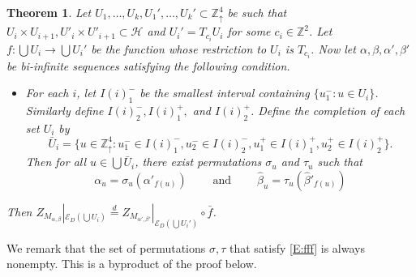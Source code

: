 \documentclass[aop, preprint]{imsart}
\theoremstyle{plain}
\newtheorem{theorem}{Theorem}[section]
\theoremstyle{definition}
\theoremstyle{plain}
\newcommand{\sset}{\subset}
\newcommand{\al}{\alpha}
\newcommand{\mathand}{\;\text{and}\;}
\newcommand{\mathfor}{\;\text{for}\;}
\newcommand{\be}{\beta}
\newcommand{\sig}{\sigma}
\newcommand{\scrE}{\mathcal{E}}
\newcommand{\Zd}{\mathds{Z}^4_\uparrow}
\newcommand{\scrH}{\mathcal{H}}
\newcommand{\Z}{\mathds{Z}}
\newcommand{\eqd}{\stackrel{d}{=}}
\newcommand{\X}{\times}
\begin{document}
\begin{theorem}
	\label{T:towers}
	Let $U_1, \dots, U_k, U_1', \dots, U_k' \sset \Zd$ be such that $U_i \X U_{i+1}, U'_i \X U'_{i+1} \sset \scrH$ and $U_i' = T_{c_i} U_i$ for some $c_i \in \Z^2$. Let $f:\bigcup U_i \to \bigcup U_i'$ be the function whose restriction to $U_i$ is $T_{c_i}$.
	Now let $\al, \be, \al', \be'$ be bi-infinite sequences satisfying the following condition.
	\begin{itemize}
		\item For each $i$, let $I(i)^-_1$ be the smallest interval
		containing $\{u^-_1 : u \in U_i\}$. Similarly define $I(i)^-_2, I(i)^+_1,$ and $I(i)^+_2$. Define the completion of each set $U_i$ by
		$$
		\bar U_i = \{u \in \Zd : u_1^- \in I(i)^-_1, u_2^-  \in I(i)^-_2, u_1^+ \in I(i)^+_1, u_2^+ \in I(i)^+_2\}.
		$$ 
		Then for all $u \in \bigcup \bar U_i$, there exist permutations $\sig_u$ and $\tau_u$ such that
		\begin{equation}
		\label{E:fff}
		\al_u = \sig_u(\al'_{f(u)}) \qquad \mathand \qquad \hat \be_u = \tau_u(\hat \be'_{f(u)})
		\end{equation}
	\end{itemize}
	Then $Z_{M_{\al, \be}}|_{\scrE_D(\bigcup U_i)} \eqd Z_{M_{\al', \be'}}|_{\scrE_D(\bigcup U_i')} \circ \bar f$.
	
\end{theorem}

We remark that the set of permutations $\sig, \tau$ that satisfy \eqref{E:fff} is always nonempty. This is a byproduct of the proof below.
\end{document}
